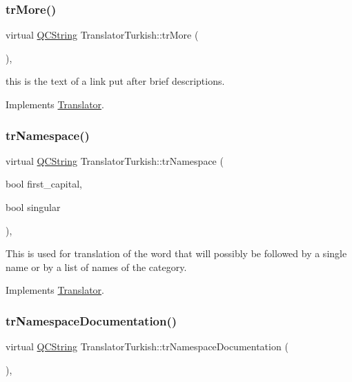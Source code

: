 \subsubsection{\texorpdfstring{trMore()}{trMore()}}
{\footnotesize\ttfamily virtual \mbox{\hyperlink{class_q_c_string}{Q\+C\+String}} Translator\+Turkish\+::tr\+More (\begin{DoxyParamCaption}{ }\end{DoxyParamCaption})\hspace{0.3cm}{\ttfamily [inline]}, {\ttfamily [virtual]}}

this is the text of a link put after brief descriptions. 

Implements \mbox{\hyperlink{class_translator}{Translator}}.

\mbox{\label{class_translator_turkish_a4ea4f5ffe32dbf13c78f9f5e09bc7c81}} 
\subsubsection{\texorpdfstring{trNamespace()}{trNamespace()}}
{\footnotesize\ttfamily virtual \mbox{\hyperlink{class_q_c_string}{Q\+C\+String}} Translator\+Turkish\+::tr\+Namespace (\begin{DoxyParamCaption}\item[{bool}]{first\+\_\+capital,  }\item[{bool}]{singular }\end{DoxyParamCaption})\hspace{0.3cm}{\ttfamily [inline]}, {\ttfamily [virtual]}}

This is used for translation of the word that will possibly be followed by a single name or by a list of names of the category. 

Implements \mbox{\hyperlink{class_translator}{Translator}}.

\mbox{\label{class_translator_turkish_aa3dffc8b8cc3a4a66ecdc328c72f1180}} 
\subsubsection{\texorpdfstring{trNamespaceDocumentation()}{trNamespaceDocumentation()}}
{\footnotesize\ttfamily virtual \mbox{\hyperlink{class_q_c_string}{Q\+C\+String}} Translator\+Turkish\+::tr\+Namespace\+Documentation (\begin{DoxyParamCaption}{ }\end{DoxyParamCaption})\hspace{0.3cm}{\ttfamily [inline]}, {\ttfamily [virtual]}}

